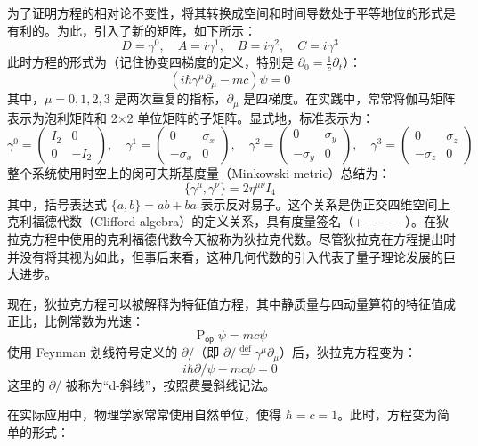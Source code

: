 为了证明方程的相对论不变性，将其转换成空间和时间导数处于平等地位的形式是有利的。为此，引入了新的矩阵，如下所示：
\[
D = \gamma^0, \quad A = i\gamma^1, \quad B = i\gamma^2, \quad C = i\gamma^3~
\]
此时方程的形式为（记住协变四梯度的定义，特别是 \(\partial_0 = \frac{1}{c} \partial_t\)）：
\[
(i\hbar \gamma^\mu \partial_\mu - mc) \psi = 0~
\]
其中，\(\mu = 0, 1, 2, 3\) 是两次重复的指标，\(\partial_\mu\) 是四梯度。在实践中，常常将伽马矩阵表示为泡利矩阵和 2×2 单位矩阵的子矩阵。显式地，标准表示为：
\[
\gamma^0 = \begin{pmatrix} I_2 & 0 \\ 0 & -I_2 \end{pmatrix}, \quad 
\gamma^1 = \begin{pmatrix} 0 & \sigma_x \\ -\sigma_x & 0 \end{pmatrix}, \quad 
\gamma^2 = \begin{pmatrix} 0 & \sigma_y \\ -\sigma_y & 0 \end{pmatrix}, \quad 
\gamma^3 = \begin{pmatrix} 0 & \sigma_z \\ -\sigma_z & 0 \end{pmatrix}~
\]
整个系统使用时空上的闵可夫斯基度量（Minkowski metric）总结为：
\[
\{ \gamma^\mu, \gamma^\nu \} = 2 \eta^{\mu \nu} I_4~
\]
其中，括号表达式 \(\{ a, b \} = ab + ba\) 表示反对易子。这个关系是伪正交四维空间上克利福德代数（Clifford algebra）的定义关系，具有度量签名（+ − − −）。在狄拉克方程中使用的克利福德代数今天被称为狄拉克代数。尽管狄拉克在方程提出时并没有将其视为如此，但事后来看，这种几何代数的引入代表了量子理论发展的巨大进步。

现在，狄拉克方程可以被解释为特征值方程，其中静质量与四动量算符的特征值成正比，比例常数为光速：
\[
\operatorname{P}_{\mathsf{op}} \psi = m c \psi~
\]
使用 Feynman 划线符号定义的 \(\partial/\)（即 \(\partial/\mathrel{\stackrel{\mathrm{def}}{=}} \gamma^\mu \partial_\mu\)）后，狄拉克方程变为：
\[
i\hbar \partial/\psi - mc \psi = 0~
\]
这里的 \(\partial/\) 被称为“d-斜线”，按照费曼斜线记法。

在实际应用中，物理学家常常使用自然单位，使得 \(\hbar = c = 1\)。此时，方程变为简单的形式：

